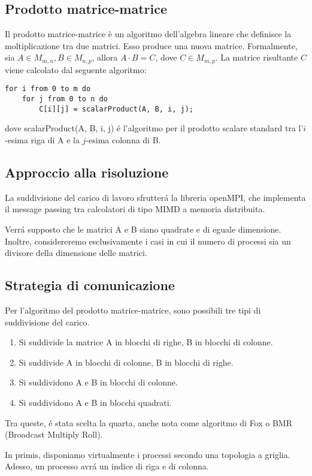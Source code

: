 \subsection{Prodotto matrice-matrice}
Il prodotto matrice-matrice è un algoritmo dell'algebra lineare che definisce la moltiplicazione tra due matrici. Esso produce una nuova matrice.
Formalmente, sia $A \in M_{m,n}, B \in M_{n,p}$, allora $A\cdot B = C$, dove $C \in M_{m,p}$.
La matrice risultante $C$ viene calcolato dal seguente algoritmo:
\begin{lstlisting}
for i from 0 to m do
    for j from 0 to n do
        C[i][j] = scalarProduct(A, B, i, j);
\end{lstlisting}
dove scalarProduct(A, B, i, j) é l'algoritmo per il prodotto scalare standard tra l'$i$-esima riga di A e la $j$-esima colonna di B.

\subsection{Approccio alla risoluzione}
La suddivisione del carico di lavoro sfrutterá la libreria openMPI, che implementa il message passing tra calcolatori di tipo MIMD a memoria distribuita.

Verrá supposto che le matrici A e B siano quadrate e di eguale dimensione. Inoltre, considereremo esclusivamente i casi in cui il numero di processi sia un divisore della dimensione delle matrici.

\subsection{Strategia di comunicazione}
Per l'algoritmo del prodotto matrice-matrice, sono possibili tre tipi di suddivisione del carico.
\begin{enumerate}
    \item Si suddivide la matrice A in blocchi di righe, B in blocchi di colonne.
    \item Si suddivide A in blocchi di colonne, B in blocchi di righe.
    \item Si suddividono A e B in blocchi di colonne.
    \item Si suddividono A e B in blocchi quadrati.
\end{enumerate}
Tra queste, é stata scelta la quarta, anche nota come algoritmo di Fox o BMR (Broadcast Multiply Roll).

In primis, disponiamo virtualmente i processi secondo una topologia a griglia. Adesso, un processo avrá un indice di riga e di colonna.


